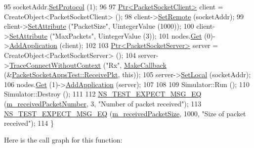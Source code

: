 \begin{DoxyCode}
95   socketAddr.\hyperlink{classns3_1_1PacketSocketAddress_a9020962e39c238277f3b2f0de605647a}{SetProtocol} (1);
96 
97   \hyperlink{classns3_1_1Ptr}{Ptr<PacketSocketClient>} client = CreateObject<PacketSocketClient> ();
98   client->\hyperlink{classns3_1_1PacketSocketClient_ae400727c451d429358b5c85838b901df}{SetRemote} (socketAddr);
99   client->\hyperlink{classns3_1_1ObjectBase_ac60245d3ea4123bbc9b1d391f1f6592f}{SetAttribute} (\textcolor{stringliteral}{"PacketSize"}, UintegerValue (1000));
100   client->\hyperlink{classns3_1_1ObjectBase_ac60245d3ea4123bbc9b1d391f1f6592f}{SetAttribute} (\textcolor{stringliteral}{"MaxPackets"}, UintegerValue (3));
101   nodes.\hyperlink{classns3_1_1NodeContainer_a9ed96e2ecc22e0f5a3d4842eb9bf90bf}{Get} (0)->\hyperlink{classns3_1_1Node_ab98b4fdc4aadc86366b80e8a79a53f47}{AddApplication} (client);
102 
103   \hyperlink{classns3_1_1Ptr}{Ptr<PacketSocketServer>} server = CreateObject<PacketSocketServer> ();
104   server->\hyperlink{classns3_1_1ObjectBase_a1be45f6fd561e75dcac9dfa81b2b81e4}{TraceConnectWithoutContext} (\textcolor{stringliteral}{"Rx"}, 
      \hyperlink{group__makecallbackmemptr_ga9376283685aa99d204048d6a4b7610a4}{MakeCallback} (&\hyperlink{classPacketSocketAppsTest_a98d4457730e534b516b66db2b1181226}{PacketSocketAppsTest::ReceivePkt}, \textcolor{keyword}{this}));
105   server->\hyperlink{classns3_1_1PacketSocketServer_a89207b49054571b480ee1d26934907d3}{SetLocal} (socketAddr);
106   nodes.\hyperlink{classns3_1_1NodeContainer_a9ed96e2ecc22e0f5a3d4842eb9bf90bf}{Get} (1)->\hyperlink{classns3_1_1Node_ab98b4fdc4aadc86366b80e8a79a53f47}{AddApplication} (server);
107 
108 
109   Simulator::Run ();
110   Simulator::Destroy ();
111 
112   \hyperlink{group__testing_ga7304ba46a28d8cf08dfdfd6499cf7068}{NS\_TEST\_EXPECT\_MSG\_EQ} (\hyperlink{classPacketSocketAppsTest_a9683f11fc55d39e7e0938d82a11de79c}{m\_receivedPacketNumber}, 3, \textcolor{stringliteral}{"Number of
       packet received"});
113   \hyperlink{group__testing_ga7304ba46a28d8cf08dfdfd6499cf7068}{NS\_TEST\_EXPECT\_MSG\_EQ} (\hyperlink{classPacketSocketAppsTest_a0738bf3e280b06db8467f6b5bf14a6b0}{m\_receivedPacketSize}, 1000, \textcolor{stringliteral}{"Size of
       packet received"});
114 \}
\end{DoxyCode}


Here is the call graph for this function\+:



